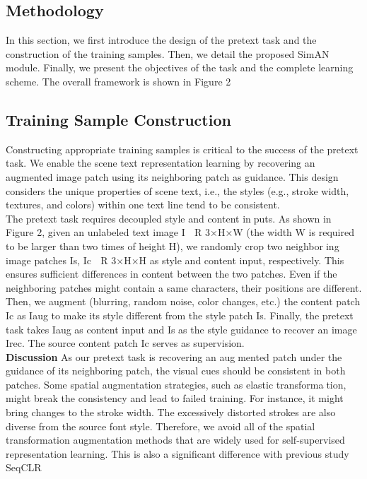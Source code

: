 \documentclass{article}
\begin{document}
\begin{multicols}{2}

\section{Methodology}
In this section, we first introduce the design of the pretext
task and the construction of the training samples. Then, we
detail the proposed SimAN module. Finally, we present the
objectives of the task and the complete learning scheme.
The overall framework is shown in Figure 2  

\subsection{Training Sample Construction}
Constructing appropriate training samples is critical to
the success of the pretext task. We enable the scene text
representation learning by recovering an augmented image
patch using its neighboring patch as guidance. This design
considers the unique properties of scene text, i.e., the styles
(e.g., stroke width, textures, and colors) within one text line
tend to be consistent.\\
The pretext task requires decoupled style and content inputs. As shown in Figure 2, given an unlabeled text image
I ∈ R
3×H×W (the width W is required to be larger than
two times of height H), we randomly crop two neighboring image patches Is, Ic ∈ R
3×H×H as style and content
input, respectively. This ensures sufficient differences in
content between the two patches. Even if the neighboring
patches might contain a same characters, their positions are
different. Then, we augment (blurring, random noise, color
changes, etc.) the content patch Ic as Iaug to make its style
different from the style patch Is. Finally, the pretext task
takes Iaug as content input and Is as the style guidance to
recover an image Irec. The source content patch Ic serves
as supervision.\\
\textbf{Discussion} As our pretext task is recovering an augmented patch under the guidance of its neighboring patch,
the visual cues should be consistent in both patches. Some
spatial augmentation strategies, such as elastic transformation, might break the consistency and lead to failed training.
For instance, it might bring changes to the stroke width.
The excessively distorted strokes are also diverse from the
source font style. Therefore, we avoid all of the spatial
transformation augmentation methods that are widely used
for self-supervised representation learning. This is also a
significant difference with previous study SeqCLR \cite{aberdam2021sequence}




\end{multicols}
\end{document}
